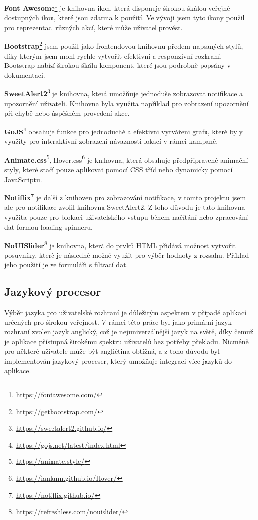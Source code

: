 \begin{description}
    \item \textbf{Font Awesome}\footnote{\href{https://fontawesome.com/}{https://fontawesome.com/}} je knihovna ikon, která disponuje širokou škálou veřejně dostupných ikon, které jsou zdarma k použití. Ve vývoji jsem tyto ikony použil pro reprezentaci různých akcí, které může uživatel provést.
    \item \textbf{Bootstrap}\footnote{\href{https://getbootstrap.com/}{https://getbootstrap.com/}} jsem použil jako frontendovou knihovnu předem napsaných stylů, díky kterým jsem mohl rychle vytvořit efektivní a responzivní rozhraní. Bootstrap nabízí širokou škálu komponent, které jsou podrobně popsány v dokumentaci.
    \item \textbf{SweetAlert2}\footnote{\href{https://sweetalert2.github.io/}{https://sweetalert2.github.io/}} je knihovna, která umožňuje jednoduše zobrazovat notifikace a upozornění uživateli. Knihovna byla využita například pro zobrazení upozornění při chybě nebo úspěšném provedení akce.
    \item \textbf{GoJS}\footnote{\href{https://gojs.net/latest/index.html}{https://gojs.net/latest/index.html}} obsahuje funkce pro jednoduché a efektivní vytváření grafů, které byly využity pro interaktivní zobrazení návaznosti lokací v rámci kampaně.
    \item \textbf{Animate.css}\footnote{\href{https://animate.style/}{https://animate.style/}}, Hover.css\footnote{\href{https://ianlunn.github.io/Hover/}{https://ianlunn.github.io/Hover/}} je knihovna, která obsahuje předpřipravené animační styly, které stačí pouze aplikovat pomocí CSS tříd nebo dynamicky pomocí JavaScriptu.
    \item \textbf{Notiflix}\footnote{\href{https://notiflix.github.io/}{https://notiflix.github.io/}} je další z knihoven pro zobrazování notifikace, v tomto projektu jsem ale pro notifikace zvolil knihovnu SweetAlert2. Z toho důvodu je tato knihovna využita pouze pro blokaci uživatelského vstupu během načítání nebo zpracování dat formou loading spinneru.
    \item \textbf{NoUISlider}\footnote{\href{https://refreshless.com/nouislider/}{https://refreshless.com/nouislider/}} je knihovna, která do prvků HTML přidává možnost vytvořit posuvníky, které je následně možné využit pro výběr hodnoty z rozsahu. Příklad jeho použití je ve formuláři s filtrací dat.
\end{description}

\subsection{Jazykový procesor}
\label{subsec:implementation-technologies-compiler}
Výběr jazyka pro uživatelské rozhraní je důležitým aspektem v případě aplikací určených pro širokou veřejnost. V rámci této práce byl jako primární jazyk rozhraní zvolen jazyk anglický, což je nejuniverzálnější jazyk na světě, díky čemuž je aplikace přístupná širokému spektru uživatelů bez potřeby překladu. Nicméně pro některé uživatele může být angličtina obtížná, a z toho důvodu byl implementován jazykový procesor, který umožňuje integraci více jazyků do aplikace.


